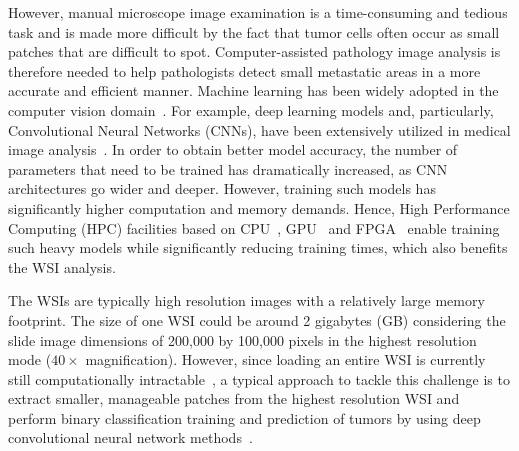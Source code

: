 However, manual microscope image examination is a time-consuming and tedious task and is made more difficult by the fact that tumor cells often occur as small patches that are difficult to spot. Computer-assisted pathology image analysis is therefore needed to help pathologists detect small metastatic areas in a more accurate and efficient manner. Machine learning has been widely adopted in the computer vision domain~\cite{khan2020machine,voulodimos2018deep,liu2020reliability}. For example, deep learning models and, particularly, Convolutional Neural Networks (CNNs), have been extensively utilized in medical image analysis~\cite{liu2021medical,liu2021review,Hou2016,Li2018,wang2021tumor,Deepa2022,gupta2022deep,singh2022breast,murtaza2020breast,chanchal2022deep}. In order to obtain better model accuracy, the number of parameters that need to be trained has dramatically increased, as CNN architectures go wider and deeper. However, training such models has significantly higher computation and memory demands. Hence, High Performance Computing (HPC) facilities based on CPU~\cite{codreanu2018}, GPU~\cite{Wang2022} and FPGA~\cite{Geng2018} enable training such heavy models while significantly reducing training times, which also benefits the WSI analysis.

The WSIs are typically high resolution images with a relatively large memory footprint. The size of one WSI could be around 2 gigabytes (GB) considering the slide image dimensions of 200,000 by 100,000 pixels in the highest resolution mode ($40\times$ magnification). However, since loading an entire WSI is currently still computationally intractable~\cite{Komura2018}, a typical approach to tackle this challenge is to extract smaller, manageable
patches from the highest resolution WSI and perform binary classification training and prediction of tumors by using deep convolutional neural network methods~\cite{Wang2016,Li2018}.

